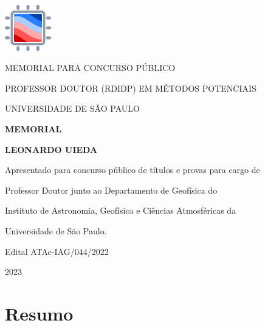 \documentclass[10pt,a4paper,oneside]{book}
\newcommand{\Year}{2023}
\newcommand{\Author}{Leonardo Uieda}
\begin{document}
\pagestyle{plain}
\frontmatter

\begin{titlepage}
  \begin{center}
    \includegraphics[height=2cm]{images/logo.pdf}
    \vspace{1cm}

    MEMORIAL PARA CONCURSO PÚBLICO

    PROFESSOR DOUTOR (RDIDP) EM MÉTODOS POTENCIAIS

    UNIVERSIDADE DE SÃO PAULO
    \vspace{5cm}

    \textbf{\LARGE MEMORIAL}
    \vspace{1cm}

    \textbf{\LARGE \MakeUppercase{\Author{}}}
    \vspace{5cm}

    {\small
      Apresentado para concurso público de títulos e provas para cargo de

      Professor Doutor junto ao Departamento de Geofísica do

      Instituto de Astronomia, Geofísica e Ciências Atmosféricas da

      Universidade de São Paulo.
      \vspace{1cm}

      Edital ATAc-IAG/044/2022
    }
    \vfill

    \Year{}
  \end{center}
\end{titlepage}

\chapter*{Resumo}
\end{document}
